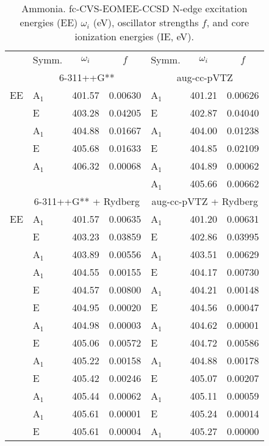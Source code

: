 \documentclass[journal=jctcce,manuscript=article]{achemso}
\begin{document}
\begin{table}[H]
\caption{Ammonia. fc-CVS-EOMEE-CCSD N-edge excitation energies (EE) $\omega_i$ (eV), oscillator strengths $f$, and core ionization energies (IE, eV). \label{Tab:Ammonia}}
\scriptsize
\begin{tabular}{l|lcc|lcc}
\cline{2-7}
& Symm. & $\omega_i$ & $f$ 
& Symm. & $\omega_i$ & $f$ \\\cline{2-7}
& \multicolumn{3}{c|}{6-311++G**} & \multicolumn{3}{c}{aug-cc-pVTZ} \\
\hline
  EE 
& A$_1$ & 401.57 & 0.00630 & A$_1$ & 401.21 & 0.00626 \\
& E     & 403.28 & 0.04205 & E     & 402.87 & 0.04040 \\
& A$_1$ & 404.88 & 0.01667 & A$_1$ & 404.00 & 0.01238 \\
& E     & 405.68 & 0.01633 & E     & 404.85 & 0.02109 \\
& A$_1$ & 406.32 & 0.00068 & A$_1$ & 404.89 & 0.00062 \\
& & & & A$_1$ & 405.66 & 0.00662 \\
\cline{2-7}
      & \multicolumn{3}{c|}{6-311++G** + Rydberg}
      & \multicolumn{3}{c}{aug-cc-pVTZ + Rydberg} \\
\hline
EE 
& A$_1$ & 401.57 & 0.00635 & A$_1$ & 401.20 & 0.00631 \\
& E     & 403.23 & 0.03859 & E     & 402.86 & 0.03995 \\
& A$_1$ & 403.89 & 0.00556 & A$_1$ & 403.51 & 0.00629 \\
& A$_1$ & 404.55 & 0.00155 & E     & 404.17 & 0.00730 \\
& E     & 404.57 & 0.00800 & A$_1$ & 404.21 & 0.00148 \\
& E     & 404.95 & 0.00020 & E     & 404.56 & 0.00047 \\
& A$_1$ & 404.98 & 0.00003 & A$_1$ & 404.62 & 0.00001 \\
& E     & 405.06 & 0.00572 & E     & 404.72 & 0.00586 \\
& A$_1$ & 405.22 & 0.00158 & A$_1$ & 404.88 & 0.00178 \\
& E     & 405.42 & 0.00246 & E     & 405.07 & 0.00207 \\
& A$_1$ & 405.44 & 0.00062 & A$_1$ & 405.11 & 0.00059 \\
& A$_1$ & 405.61 & 0.00001 & E     & 405.24 & 0.00014 \\
& E     & 405.61 & 0.00004 & A$_1$ & 405.27 & 0.00000 \\

\end{tabular}
\end{table}
\end{document}
